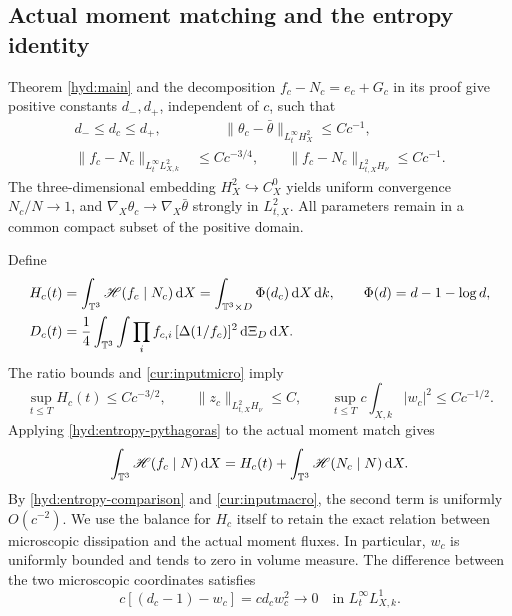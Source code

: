 \subsection{Actual moment matching and the entropy identity}

Theorem \ref{hyd:main} and the decomposition $f_c-N_c=e_c+G_c$ in its
proof give positive constants $d_-,d_+$, independent of $c$, such that
\begin{align}
 d_-\le d_c\le d_+,&\qquad
 \|\theta_c-\bar\theta\|_{L^\infty_tH^2_X}\le Cc^{-1},
          \label{cur:inputmacro}\\
 \|f_c-N_c\|_{L^\infty_tL^2_{X,k}}&\le Cc^{-3/4},\qquad
 \|f_c-N_c\|_{L^2_{t,X}H_\nu}\le Cc^{-1}.
          \label{cur:inputmicro}
\end{align}
The three-dimensional embedding $H^2_X\hookrightarrow C^0_X$ yields
uniform convergence $N_c/N\to1$, and
$\nabla_X\theta_c\to\nabla_X\bar\theta$ strongly in $L^2_{t,X}$.
All parameters remain in a common compact subset of the positive domain.

Define
\begin{align}
 H_c(t)&=\int_{\mathbb T^3}\mathscr H(f_c\mid N_c)\,\mathrm d X
       =\int_{\mathbb T^3\times D}\Phi(d_c)\,\mathrm d X\,\mathrm d k,
       \qquad\Phi(d)=d-1-\log d,\label{cur:entropydef}\\
 D_c(t)&=\frac14\int_{\mathbb T^3}\int
       \prod_i f_{c,i}\,[\Delta(1/f_c)]^2\,\mathrm d\Xi_D\,\mathrm d X.
       \label{cur:dissdef}
\end{align}
The ratio bounds and \eqref{cur:inputmicro} imply
\begin{equation}\label{cur:entropybound}
 \sup_{t\le T}H_c(t)\le Cc^{-3/2},\qquad
 \|z_c\|_{L^2_{t,X}H_\nu}\le C,\qquad
 \sup_{t\le T}c\int_{X,k}|w_c|^2\le Cc^{-1/2}.
\end{equation}
Applying \eqref{hyd:entropy-pythagoras} to the actual moment match gives
\begin{equation}\label{cur:entropy-splitting}
 \int_{\mathbb T^3}\mathscr H(f_c\mid N)\,\mathrm d X
       =H_c(t)+\int_{\mathbb T^3}\mathscr H(N_c\mid N)\,\mathrm d X.
\end{equation}
By \eqref{hyd:entropy-comparison} and \eqref{cur:inputmacro}, the second
term is uniformly $O(c^{-2})$. We use the balance for $H_c$ itself
to retain the exact relation between microscopic dissipation and
the actual moment fluxes.
In particular, $w_c$ is uniformly bounded and tends to zero in volume
measure. The difference between the two microscopic coordinates satisfies
\begin{equation}\label{cur:coordinatedifference}
 c[(d_c-1)-w_c]=cd_cw_c^2\longrightarrow0
                 \quad\text{in }L^\infty_tL^1_{X,k}.
\end{equation}

